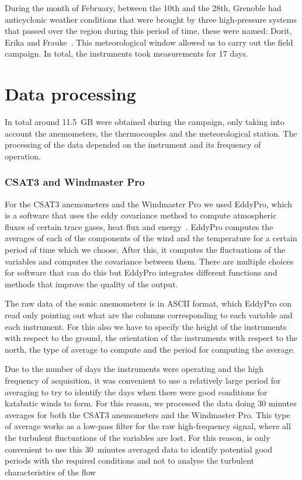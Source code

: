 During the month of February, between the 10th and the 28th,  Grenoble had anticyclonic weather conditions that were brought by three high-pressure systems that passed over the region during this period of time, these were named: Dorit, Erika and Frauke~\citep{highslist}. This meteorological window allowed us to carry out the field campaign. In total, the instruments took measurements for 17 days.

\section{Data processing}

In total around 11.5~GB were obtained during the campaign, only taking into account the anemometers, the thermocouples and the meteorological station. The processing of the data depended on the instrument and its frequency of operation. 

\subsubsection{CSAT3 and Windmaster Pro}

For the CSAT3 anemometers and the Windmaster Pro we used EddyPro, which is a software that uses the eddy covariance method to compute atmospheric fluxes of certain trace gases, heat flux and energy~\citep{burba2013eddy}. EddyPro computes the averages of each of the components of the wind and the temperature for a certain period of time which we choose. After this, it computes the fluctuations of the variables and computes the covariance between them. There are multiple choices for software that can do this but EddyPro integrates different functions and methods that improve the quality of the output. 

The raw data of the sonic anemometers is in ASCII format, which EddyPro con read only pointing out what are the columns corresponding to each variable and each instrument. For this also we have to specify the height of the instruments with respect to the ground, the orientation of the instruments with respect to the north, the type of average to compute and the period for computing the average. 

Due to the number of days the instruments were operating and the high frequency of acquisition, it was convenient to use a relatively large period for averaging to try to identify the days when there were good conditions for katabatic winds to form. For this reason, we processed the data doing 30 minutes averages for both the CSAT3 anemometers and the Windmaster Pro. This type of average works as a low-pass filter for the raw high-frequency signal, where all the turbulent fluctuations of the variables are lost. For this reason, is only convenient to use this 30~minutes averaged data to identify potential good periods with the required conditions and not to analyse the turbulent characteristics of the flow

